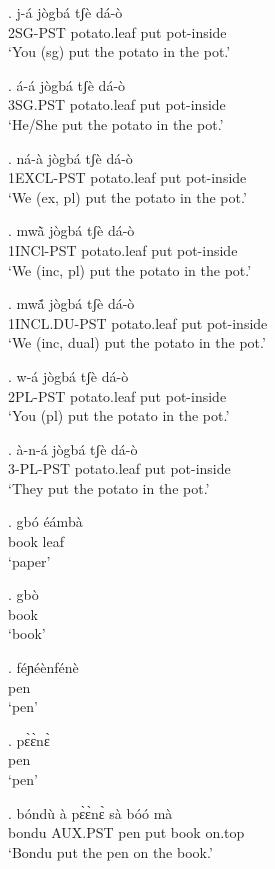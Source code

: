 \documentclass{assets/fieldnotes}
\begin{document}
\exg. j-á jògbá tʃè dá-ò \\
2SG-PST potato.leaf put pot-inside \\
`You (sg) put the potato in the pot.'

\exg. á-á jògbá tʃè dá-ò \\
3SG.PST potato.leaf put pot-inside \\
`He/She put the potato in the pot.'

\exg. ná-à jògbá tʃè dá-ò \\
1EXCL-PST potato.leaf put pot-inside \\
`We (ex, pl) put the potato in the pot.'

\exg. mwã̀ jògbá tʃè dá-ò \\
1INCl-PST potato.leaf put pot-inside \\
`We (inc, pl) put the potato in the pot.'

\exg. mwã́ jògbá tʃè dá-ò \\
1INCL.DU-PST potato.leaf put pot-inside \\
`We (inc, dual) put the potato in the pot.'

\exg. w-á jògbá tʃè dá-ò \\
2PL-PST potato.leaf put pot-inside \\
`You (pl) put the potato in the pot.'

\exg. à-n-á jògbá tʃè dá-ò \\
3-PL-PST potato.leaf put pot-inside \\
`They put the potato in the pot.'


\exg. gbó éámbà \\
book leaf \\
`paper'

\exg. gbò \\
book\\
`book'

\exg. féɲéènfénè \\
pen\\
`pen'

\exg. pɛ̀ɛ̀nɛ̀ \\
pen\\
`pen'

\exg. bóndù à pɛ̀ɛ̀nɛ̀ sà bóó mà \\
bondu AUX.PST pen put book on.top \\
`Bondu put the pen on the book.'
\end{document}
